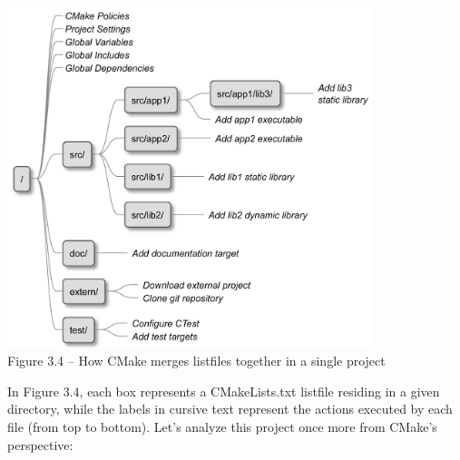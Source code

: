 \begin{center}
\includegraphics[width=0.8\textwidth]{content/1/chapter3/images/4.jpg}\\
Figure 3.4 – How CMake merges listfiles together in a single project
\end{center}

In Figure 3.4, each box represents a CMakeLists.txt listfile residing in a given directory, while the labels in cursive text represent the actions executed by each file (from top to bottom). Let's analyze this project once more from CMake's perspective:

